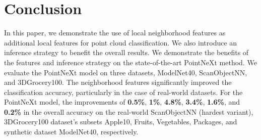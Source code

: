 \documentclass[runningheads]{llncs}
\begin{document}
\section{Conclusion}
In this paper, we demonstrate the use of local neighborhood features as additional local features for point cloud classification. We also introduce an inference strategy to benefit the overall results. We demonstrate the benefits of the features and inference strategy on the state-of-the-art PointNeXt method. We evaluate the PointNeXt model on three datasets, ModelNet40, ScanObjectNN, and 3DGrocery100. The neighborhood features significantly improved the classification accuracy, particularly in the case of real-world datasets. For the PointNeXt model, the improvements of \textbf{0.5\%}, \textbf{1\%}, \textbf{4.8\%}, \textbf{3.4\%}, \textbf{1.6\%}, and \textbf{0.2\%} in the overall accuracy on the real-world ScanObjectNN (hardest variant), 3DGrocery100 dataset's subsets Apple10, Fruits, Vegetables, Packages, and synthetic dataset ModelNet40, respectively.
\end{document}
